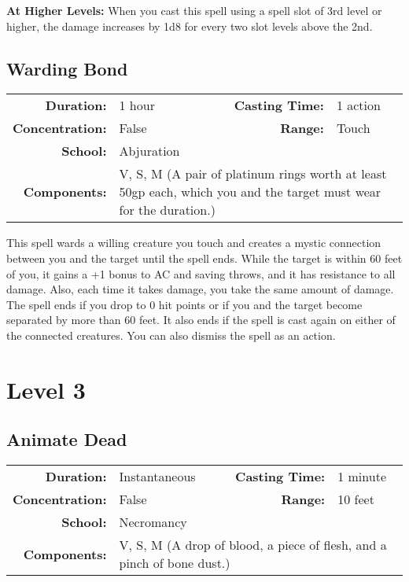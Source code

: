 \documentclass[a5paper, 12pt]{memoir}
\begin{document}
\vspace{8pt} \noindent\textbf{At Higher Levels:} When you cast this spell using a spell slot of 3rd level or higher, the damage increases by 1d8 for every two slot levels above the 2nd.
\newpage
\section*{Warding Bond}

{
\small\centering\vspace{-6pt}
\begin{tabular}{rlrl}
\toprule

\textbf{Duration:} & 1 hour &
\textbf{Casting Time:} & 1 action \\
\textbf{Concentration:} & False &
\textbf{Range:} & Touch \\
\textbf{School:} & Abjuration \\
\textbf{Components:} & \multicolumn{3}{p{0.7\textwidth}}{V, S, M (A pair of platinum rings worth at least 50gp each, which you and the target must wear for the duration.)}\\

\bottomrule
\end{tabular}
}

\vspace{1\baselineskip}\noindent This spell wards a willing creature you touch and creates a mystic connection between you and the target until the spell ends. While the target is within 60 feet of you, it gains a +1 bonus to AC and saving throws, and it has resistance to all damage. Also, each time it takes damage, you take the same amount of damage. The spell ends if you drop to 0 hit points or if you and the target become separated by more than 60 feet. It also ends if the spell is cast again on either of the connected creatures. You can also dismiss the spell as an action.

\newpage
\chapter*{Level 3} 
\section*{Animate Dead}

{
\small\centering\vspace{-6pt}
\begin{tabular}{rlrl}
\toprule

\textbf{Duration:} & Instantaneous &
\textbf{Casting Time:} & 1 minute \\
\textbf{Concentration:} & False &
\textbf{Range:} & 10 feet \\
\textbf{School:} & Necromancy \\
\textbf{Components:} & \multicolumn{3}{p{0.7\textwidth}}{V, S, M (A drop of blood, a piece of flesh, and a pinch of bone dust.)}\\

\bottomrule
\end{tabular}
}
\end{document}
